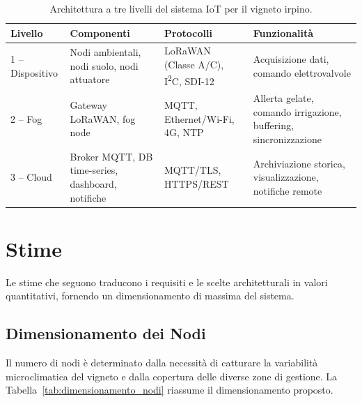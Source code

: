 \begin{table}[H]
	\centering
	\small
	\begin{tabularx}{\textwidth}{|l|X|X|X|}
		\hline
		\textbf{Livello} & \textbf{Componenti} & \textbf{Protocolli} & \textbf{Funzionalità} \\
		\hline
		1 -- Dispositivo & Nodi ambientali, nodi suolo, nodi attuatore & LoRaWAN (Classe A/C), I\textsuperscript{2}C, SDI-12 & Acquisizione dati, comando elettrovalvole \\
		\hline
		2 -- Fog & Gateway LoRaWAN, fog node & MQTT, Ethernet/Wi-Fi, 4G, NTP & Allerta gelate, comando irrigazione, buffering, sincronizzazione \\
		\hline
		3 -- Cloud & Broker MQTT, DB time-series, dashboard, notifiche & MQTT/TLS, HTTPS/REST & Archiviazione storica, visualizzazione, notifiche remote \\
		\hline
	\end{tabularx}
	\caption{Architettura a tre livelli del sistema IoT per il vigneto irpino.}
	\label{tab:architettura_livelli}
\end{table}


\section{Stime}

Le stime che seguono traducono i requisiti e le scelte architetturali in valori quantitativi, fornendo un dimensionamento di massima del sistema.

\subsection{Dimensionamento dei Nodi}

Il numero di nodi è determinato dalla necessità di catturare la variabilità microclimatica del vigneto e dalla copertura delle diverse zone di gestione. La Tabella~\ref{tab:dimensionamento_nodi} riassume il dimensionamento proposto.

